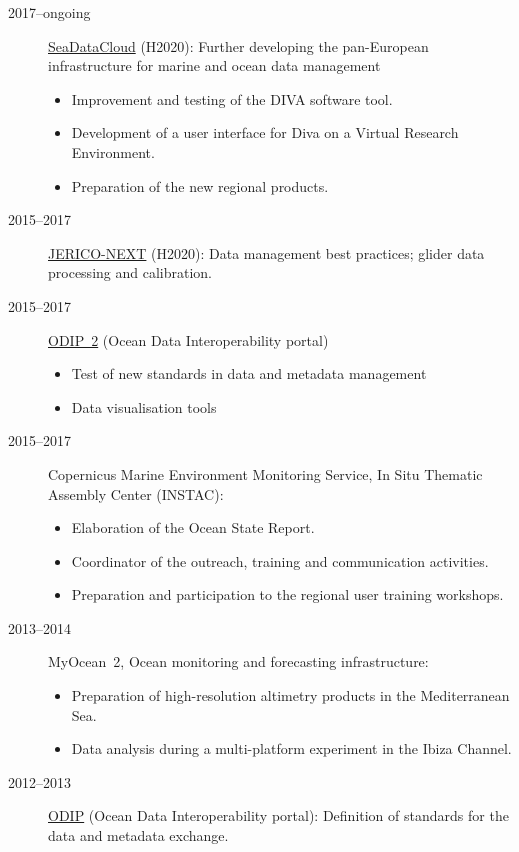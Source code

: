 \documentclass[11pt,a4paper,svgnames]{article}
\begin{document}
\begin{description}
\item[2017--ongoing] \href{https://www.seadatanet.org}{SeaDataCloud} (H2020): Further developing the pan-European infrastructure for marine and ocean data management
\begin{itemize}
\item Improvement and testing of the DIVA software tool.
\item Development of a user interface for Diva on a Virtual Research Environment.
\item Preparation of the new regional products.
\end{itemize}


\item[2015--2017] \href{http://www.jerico-ri.eu/}{JERICO-NEXT} (H2020): Data management best practices; glider data processing and calibration.
\item[2015--2017] \href{http://www.odip.eu/}{ODIP~2} (Ocean Data Interoperability portal)
\begin{itemize}
\item Test of new standards in data and metadata management 
\item Data visualisation tools
\end{itemize}

\item[2015--2017] Copernicus Marine Environment Monitoring Service, In Situ Thematic Assembly Center (INSTAC):
\begin{itemize}
\item Elaboration of the Ocean State Report.
\item Coordinator of the outreach, training and communication activities.
\item Preparation and participation to the regional user training workshops.
\end{itemize}

\item[2013--2014] MyOcean~2, Ocean monitoring and forecasting infrastructure:
\begin{itemize}
\item Preparation of high-resolution altimetry products in the Mediterranean Sea.
\item Data analysis during a multi-platform experiment in the Ibiza Channel.
\end{itemize}

\item[2012--2013] \href{http://www.odip.eu/}{ODIP} (Ocean Data Interoperability portal): Definition of standards for the data and metadata exchange.


\end{description}
\end{document}
